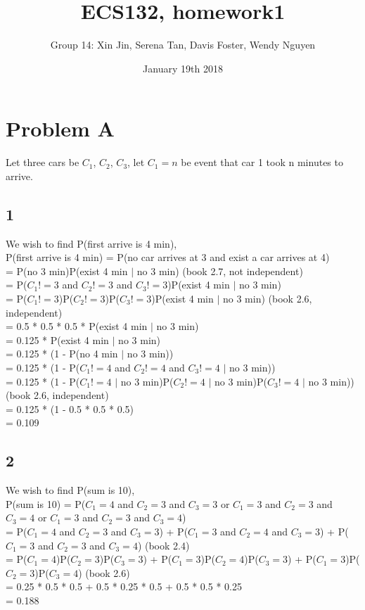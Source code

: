 \documentclass{article}
\title{ECS132, homework1}
\author{Group 14: Xin Jin, Serena Tan, Davis Foster, Wendy Nguyen}
\date{January 19th 2018}
\begin{document}
\maketitle

\section{Problem A}
Let three cars be $C_{1}$, $C_{2}$, $C_{3}$, let $C_{1} = n$ be event that car 1 took n minutes to arrive.
\subsection{1}
We wish to find P(first arrive is 4 min),\\
P(first arrive is 4 min) = P(no car arrives at 3 and exist a car arrives at 4)\\
= P(no 3 min)P(exist 4 min $|$ no 3 min) (book 2.7, not independent)\\
= P($C_{1}!=3$ and $C_{2}!=3$ and $C_{3}!=3$)P(exist 4 min $|$ no 3 min)\\
= P($C_{1}!=3$)P($C_{2}!=3$)P($C_{3}!=3$)P(exist 4 min $|$ no 3 min) (book 2.6, independent)\\
= 0.5 * 0.5 * 0.5 * P(exist 4 min $|$ no 3 min)\\
= 0.125 * P(exist 4 min $|$ no 3 min)\\
= 0.125 * (1 - P(no 4 min $|$ no 3 min))\\
= 0.125 * (1 - P($C_{1}!=4$ and $C_{2}!=4$ and $C_{3}!=4$ $|$ no 3 min))\\
= 0.125 * (1 - P($C_{1}!=4$ $|$ no 3 min)P($C_{2}!=4$ $|$ no 3 min)P($C_{3}!=4$ $|$ no 3 min)) (book 2.6, independent)\\
= 0.125 * (1 - 0.5 * 0.5 * 0.5)\\
= 0.109\\

\subsection{2}
We wish to find P(sum is 10),\\
P(sum is 10) = P($C_{1}=4$ and $C_{2}=3$ and $C_{3}=3$ or $C_{1}=3$ and $C_{2}=3$ and $C_{3}=4$ or $C_{1}=3$ and $C_{2}=3$ and $C_{3}=4$)\\
= P($C_{1}=4$ and $C_{2}=3$ and $C_{3}=3$) + P($C_{1}=3$ and $C_{2}=4$ and $C_{3}=3$) + P($C_{1}=3$ and $C_{2}=3$ and $C_{3}=4$) (book 2.4)\\
= P($C_{1}=4$)P($C_{2}=3$)P($C_{3}=3$) + P($C_{1}=3$)P($C_{2}=4$)P($C_{3}=3$) + P($C_{1}=3$)P($C_{2}=3$)P($C_{3}=4$) (book 2.6)\\
= 0.25 * 0.5 * 0.5 + 0.5 * 0.25 * 0.5 + 0.5 * 0.5 * 0.25\\
= 0.188\\
\end{document}

